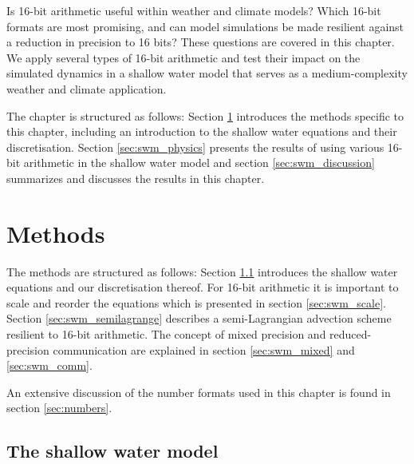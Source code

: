 Is 16-bit arithmetic useful within weather and climate models? Which 16-bit formats are most promising, and can model
simulations be made resilient against a reduction in precision to 16 bits? These questions are covered in this chapter.
We apply several types of 16-bit arithmetic and test their impact on the simulated dynamics in a shallow water model that
serves as a medium-complexity weather and climate application.

The chapter is structured as follows: Section \ref{sec:swm_methods} introduces the methods specific to this chapter, including
an introduction to the shallow water equations and their discretisation. Section \ref{sec:swm_physics} presents the results of
using various 16-bit arithmetic in the shallow water model and section \ref{sec:swm_discussion} summarizes and discusses
the results in this chapter.

\section{Methods}
\label{sec:swm_methods}

The methods are structured as follows: Section \ref{sec:swm_swm} introduces the shallow water equations and our
discretisation thereof. For 16-bit arithmetic it is important to scale and reorder the equations which is presented in 
section \ref{sec:swm_scale}. Section \ref{sec:swm_semilagrange} describes a semi-Lagrangian advection scheme
resilient to 16-bit arithmetic. The concept of mixed precision and reduced-precision communication are explained
in section \ref{sec:swm_mixed} and \ref{sec:swm_comm}.

An extensive discussion of the number formats used in this chapter is found in section \ref{sec:numbers}.

\subsection{The shallow water model}
\label{sec:swm_swm}

